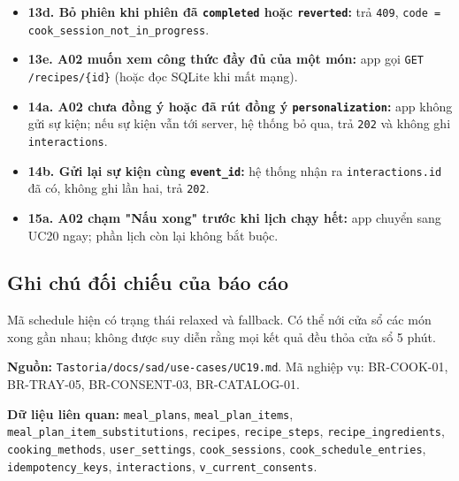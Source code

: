 \begin{itemize}
\item \textbf{13d. Bỏ phiên khi phiên đã {\small\texttt{completed}} hoặc {\small\texttt{reverted}}:} trả {\small\texttt{409}}, {\small\texttt{code = cook\_\allowbreak{}\allowbreak{}session\_\allowbreak{}\allowbreak{}not\_\allowbreak{}\allowbreak{}in\_\allowbreak{}\allowbreak{}progress}}.
\item \textbf{13e. A02 muốn xem công thức đầy đủ của một món:} app gọi {\small\texttt{GET /\allowbreak{}\allowbreak{}recipes/\allowbreak{}\allowbreak{}\{id\}}} (hoặc đọc SQLite khi mất mạng).
\item \textbf{14a. A02 chưa đồng ý hoặc đã rút đồng ý {\small\texttt{personalization}}:} app không gửi sự kiện; nếu sự kiện vẫn tới server, hệ thống bỏ qua, trả {\small\texttt{202}} và không ghi {\small\texttt{interactions}}.
\item \textbf{14b. Gửi lại sự kiện cùng {\small\texttt{event\_\allowbreak{}\allowbreak{}id}}:} hệ thống nhận ra {\small\texttt{interactions.\allowbreak{}id}} đã có, không ghi lần hai, trả {\small\texttt{202}}.
\item \textbf{15a. A02 chạm "Nấu xong" trước khi lịch chạy hết:} app chuyển sang UC20 ngay; phần lịch còn lại không bắt buộc.
\end{itemize}
\subsection{Ghi chú đối chiếu của báo cáo}
Mã schedule hiện có trạng thái relaxed và fallback. Có thể nới cửa sổ các món xong gần nhau; không được suy diễn rằng mọi kết quả đều thỏa cửa sổ 5 phút.

\textbf{Nguồn:} {\small\texttt{Tastoria/\allowbreak{}\allowbreak{}docs/\allowbreak{}\allowbreak{}sad/\allowbreak{}\allowbreak{}use-\allowbreak{}cases/\allowbreak{}\allowbreak{}UC19.\allowbreak{}md}}. Mã nghiệp vụ: BR-\allowbreak{}COOK-\allowbreak{}01, BR-\allowbreak{}TRAY-\allowbreak{}05, BR-\allowbreak{}CONSENT-\allowbreak{}03, BR-\allowbreak{}CATALOG-\allowbreak{}01.

\textbf{Dữ liệu liên quan:} {\small\texttt{meal\_\allowbreak{}\allowbreak{}plans}}, {\small\texttt{meal\_\allowbreak{}\allowbreak{}plan\_\allowbreak{}\allowbreak{}items}}, {\small\texttt{meal\_\allowbreak{}\allowbreak{}plan\_\allowbreak{}\allowbreak{}item\_\allowbreak{}\allowbreak{}substitutions}}, {\small\texttt{recipes}}, {\small\texttt{recipe\_\allowbreak{}\allowbreak{}steps}}, {\small\texttt{recipe\_\allowbreak{}\allowbreak{}ingredients}}, {\small\texttt{cooking\_\allowbreak{}\allowbreak{}methods}}, {\small\texttt{user\_\allowbreak{}\allowbreak{}settings}}, {\small\texttt{cook\_\allowbreak{}\allowbreak{}sessions}}, {\small\texttt{cook\_\allowbreak{}\allowbreak{}schedule\_\allowbreak{}\allowbreak{}entries}}, {\small\texttt{idempotency\_\allowbreak{}\allowbreak{}keys}}, {\small\texttt{interactions}}, {\small\texttt{v\_\allowbreak{}\allowbreak{}current\_\allowbreak{}\allowbreak{}consents}}.


